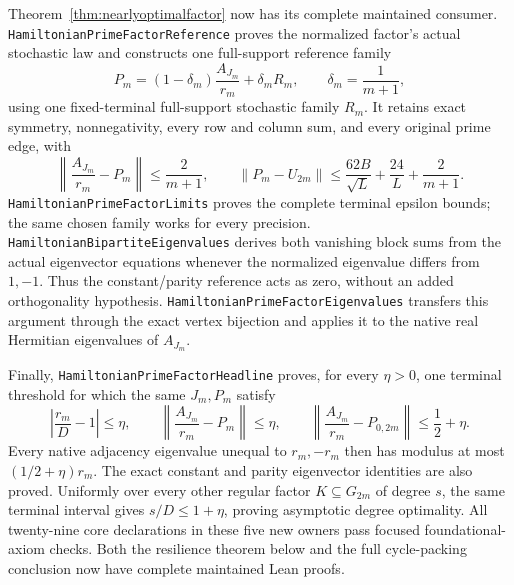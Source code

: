 Theorem~\ref{thm:nearlyoptimalfactor} now has its complete
maintained consumer. \texttt{HamiltonianPrimeFactorReference}
proves the normalized factor's actual stochastic law and
constructs one full-support reference family
\[
 P_m=(1-\delta_m)\frac{A_{J_m}}{r_m}+\delta_m R_m,
 \qquad \delta_m=\frac1{m+1},
\]
using one fixed-terminal full-support stochastic family \(R_m\).
It retains exact symmetry, nonnegativity, every row and column
sum, and every original prime edge, with
\[
 \left\|\frac{A_{J_m}}{r_m}-P_m\right\|\leq\frac2{m+1},
 \qquad
 \|P_m-U_{2m}\|\leq
       \frac{62B}{\sqrt L}+\frac{24}L+\frac2{m+1}.
\]
\texttt{HamiltonianPrimeFactorLimits} proves the complete
terminal epsilon bounds; the same chosen family works for
every precision. \texttt{HamiltonianBipartiteEigenvalues}
derives both vanishing block sums from the actual eigenvector
equations whenever the normalized eigenvalue differs from
\(1,-1\). Thus the constant/parity reference acts as zero,
without an added orthogonality hypothesis.
\texttt{HamiltonianPrimeFactorEigenvalues} transfers this
argument through the exact vertex bijection and applies it
to the native real Hermitian eigenvalues of \(A_{J_m}\).

Finally, \texttt{HamiltonianPrimeFactorHeadline} proves,
for every \(\eta>0\), one terminal threshold for which the
same \(J_m,P_m\) satisfy
\[
 \left|\frac{r_m}{D}-1\right|\leq\eta,\qquad
 \left\|\frac{A_{J_m}}{r_m}-P_m\right\|\leq\eta,\qquad
 \left\|\frac{A_{J_m}}{r_m}-P_{0,2m}\right\|
       \leq\frac12+\eta .
\]
Every native adjacency eigenvalue unequal to \(r_m,-r_m\)
then has modulus at most \((1/2+\eta)r_m\).
The exact constant and parity eigenvector identities are
also proved. Uniformly over every other regular factor
\(K\subseteq G_{2m}\) of degree \(s\), the same terminal
interval gives \(s/D\leq1+\eta\), proving asymptotic degree
optimality. All twenty-nine core declarations in these five
new owners pass focused foundational-axiom checks.
Both the resilience theorem below and the full cycle-packing
conclusion now have complete maintained Lean proofs.

